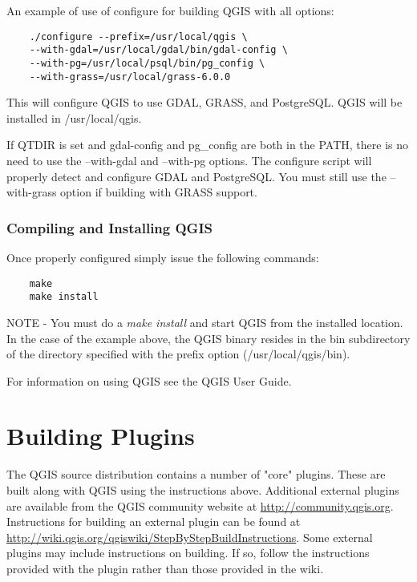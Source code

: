 An example of use of configure for building QGIS with all options:
  
  \begin{verbatim}
    ./configure --prefix=/usr/local/qgis \
    --with-gdal=/usr/local/gdal/bin/gdal-config \
    --with-pg=/usr/local/psql/bin/pg_config \
    --with-grass=/usr/local/grass-6.0.0
  \end{verbatim}
  
This will configure QGIS to use GDAL, GRASS, and PostgreSQL. QGIS will be 
installed in /usr/local/qgis.

If QTDIR is set and gdal-config and pg\_config are both in the PATH, there
is no need to use the --with-gdal and --with-pg options. The configure
script will properly detect and configure GDAL and PostgreSQL. You must
still use the --with-grass option if building with GRASS support.
  
\subsubsection{Compiling and Installing QGIS}
  
Once properly configured simply issue the following commands:
  
\begin{verbatim}
    make
    make install
\end{verbatim}

NOTE - You must do a \textit{make install} and start QGIS from the
installed location. In the case of the example above, the QGIS binary
resides in the bin subdirectory of the directory specified with the prefix
option (/usr/local/qgis/bin).

For information on using QGIS see the QGIS User Guide.

\section{Building Plugins}

The QGIS source distribution contains a number of "core" plugins. These are
built along with QGIS using the instructions above. Additional external
plugins are available from the QGIS community website at
\url{http://community.qgis.org}. Instructions for building an external
plugin can be found at
\url{http://wiki.qgis.org/qgiswiki/StepByStepBuildInstructions}.
Some external plugins may include instructions on building. If so, follow
the instructions provided with the plugin rather than those provided in the
wiki. 
